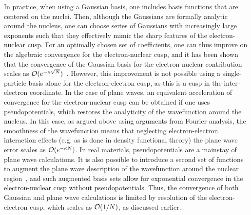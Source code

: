 \documentclass[superscriptaddress,aps,pra,nofootinbib,notitlepage,10pt,longbibliography]{revtex4-1}
\begin{document}
In practice, when using a Gaussian basis, one includes basis functions that are centered on the nuclei. Then, although the Gaussians are formally analytic around the nucleus, one can choose series of Gaussians with increasingly large exponents such that they effectively mimic the sharp features of the electron-nuclear cusp. For an optimally chosen set of coefficients, one can thus improve on the algebraic convergence for the electron-nuclear cusp, and
it has been shown that the convergence of the Gaussian basis for the electron-nuclear contribution scales as ${\cal O}(e^{-\kappa \sqrt{N}})$~\cite{klopper1986gaussian,kutzelnigg1994theory}. However, this improvement is not possible using a single-particle basis alone for the electron-electron cusp, as this is a cusp in the inter-electron coordinate. In the case of plane waves, an equivalent acceleration of convergence for the electron-nuclear cusp can be obtained if one uses pseudopotentials, which restores the analyticity of the wavefunction around the nucleus. In this case, as argued above using arguments from Fourier analysis, the smoothness of the wavefunction means that neglecting electron-electron interaction effects (e.g. as is done in density functional theory) the plane wave error scales as ${\cal O}(e^{-\kappa N})$. In real materials, pseudopotentials are a mainstay of plane wave calculations. It is also possible to introduce a second set of functions to augment the plane wave description of the wavefunction around the nuclear region~\cite{pahl2002plane,lippert1997hybrid,sun2017gaussian}, and such augmented basis sets allow for exponential convergence in the electron-nuclear cusp without pseudopotentials. Thus, the convergence of both Gaussian and plane wave calculations is limited by resolution of the electron-electron cusp, which scales as ${\cal O}(1/N)$, as discussed earlier.
\end{document}
